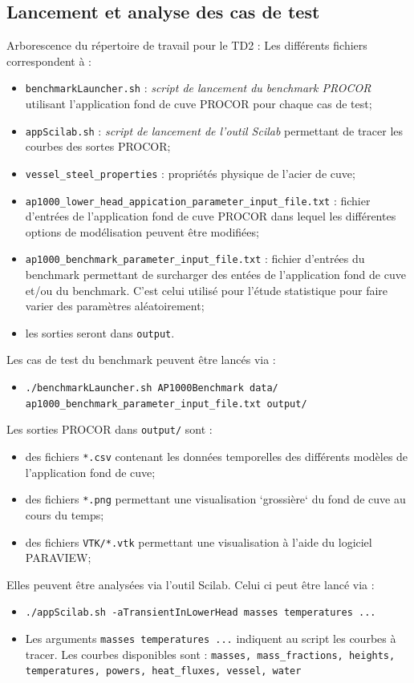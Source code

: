 \documentclass[3p]{elsarticle}
\begin{document}
\subsection{Lancement et analyse des cas de test}
Arborescence du répertoire de travail pour le TD2 :
Les différents fichiers correspondent à :
\begin{itemize}
	\item \texttt{benchmarkLauncher.sh} : \emph{script de lancement du benchmark PROCOR} utilisant l'application fond de cuve PROCOR pour chaque cas de test;
	\item \texttt{appScilab.sh} : \emph{script de lancement de l'outil Scilab} permettant de tracer les courbes des sortes PROCOR;
	\item \texttt{vessel\_steel\_properties} : propriétés physique de l'acier de cuve;
	\item \texttt{ap1000\_lower\_head\_appication\_parameter\_input\_file.txt} : fichier d'entrées de l'application fond de cuve PROCOR dans lequel les différentes options de modélisation peuvent être modifiées;
	\item \texttt{ap1000\_benchmark\_parameter\_input\_file.txt} : fichier d'entrées du benchmark permettant de surcharger des entées de l'application fond de cuve et/ou du benchmark. C'est celui utilisé pour l'étude statistique pour faire varier des paramètres aléatoirement;
	\item les sorties seront dans \texttt{output}.
\end{itemize}
Les cas de test du benchmark peuvent être lancés via :
\begin{itemize}
\item \texttt{./benchmarkLauncher.sh AP1000Benchmark data/ ap1000\_benchmark\_parameter\_input\_file.txt output/}
\end{itemize}
Les sorties PROCOR dans \texttt{output/} sont :
\begin{itemize}
\item des fichiers \texttt{*.csv} contenant les données temporelles des différents modèles de l'application fond de cuve;
\item des fichiers \texttt{*.png} permettant une visualisation `grossière` du fond de cuve au cours du temps;
\item des fichiers \texttt{VTK/*.vtk} permettant une visualisation à l'aide du logiciel PARAVIEW;
\end{itemize}
Elles peuvent être analysées via l'outil Scilab. Celui ci peut être lancé via :
\begin{itemize}
\item \texttt{./appScilab.sh -aTransientInLowerHead masses temperatures ...}
\item Les arguments \texttt{masses temperatures ...} indiquent au script les courbes à tracer. Les courbes disponibles sont : \texttt{masses, mass\_fractions, heights, temperatures, powers, heat\_fluxes, vessel, water}
\end{itemize}
\end{document}
